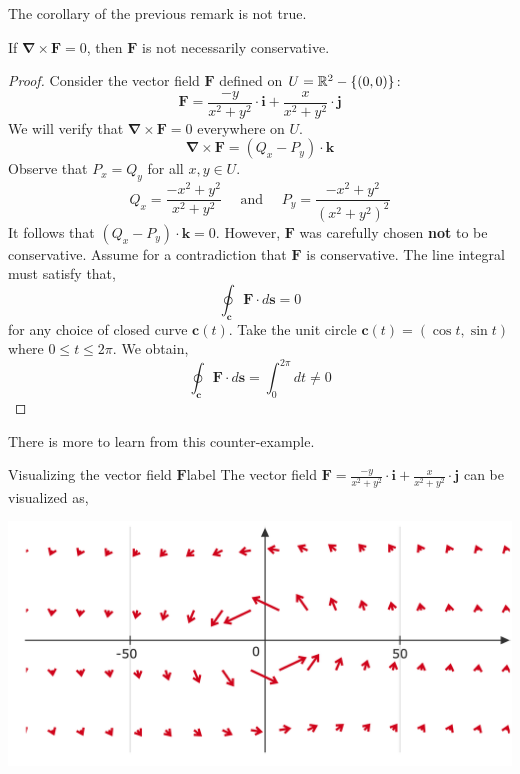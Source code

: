 \hfill

\noindent The corollary of the previous remark is not true.

\hfill

\begin{rmk}
	If $\mathbf{\nabla} \times \mathbf{F} = 0$, then $\mathbf{F}$ is not necessarily conservative.
\end{rmk}

\begin{proof}
	Consider the vector field $\mathbf{F}$ defined on $U = \mathbb{R}^2 - \{(0,0)\}$:
	\[\mathbf{F}=\frac{-y}{x^2+y^2} \cdot \mathbf{i}+\frac{x}{x^2+y^2} \cdot \mathbf{j}\]
	We will verify that $\mathbf{\nabla} \times \mathbf{F} = 0$ everywhere on $U$.
	\[\mathbf{\nabla} \times \mathbf{F} = (Q_x - P_y) \cdot \mathbf{k}\]
	Observe that $P_x = Q_y$ for all $x, y \in U$.
	\[Q_x = \frac{-x^2 + y^2}{x^2+y^2} \quad \text{ and } \quad P_y = \frac{-x^2+y^2}{(x^2+y^2)^2}\]
	It follows that $(Q_x - P_y) \cdot \mathbf{k} = 0$. However, $\mathbf{F}$ was carefully chosen \textbf{not} to be conservative. Assume for a contradiction that $\mathbf{F}$ is conservative. The line integral must satisfy that,
	\[\oint_{\mathbf{c}} \mathbf{F} \cdot d \mathbf{s} = 0\]
	for any choice of closed curve $\mathbf{c}(t)$. Take the unit circle $\mathbf{c}(t) = (\cos t, \sin t)$ where $0 \leq t \leq 2\pi$.  We obtain,
	\[\oint_{\mathbf{c}} \mathbf{F} \cdot d \mathbf{s} = \int_{0}^{2\pi} d t \neq 0\]
\end{proof}

\hfill 

\noindent There is more to learn from this counter-example. 

\hfill 

\begin{ex}{Visualizing the vector field $\mathbf{F}$}{label}
	The vector field $\mathbf{F}=\frac{-y}{x^2+y^2} \cdot \mathbf{i}+\frac{x}{x^2+y^2} \cdot \mathbf{j}$ can be visualized as,

	\hfill

	\begin{center}
	\includegraphics[width=\linewidth]{figures/wk-7/fig-3.png}
	\end{center}

\end{ex}

